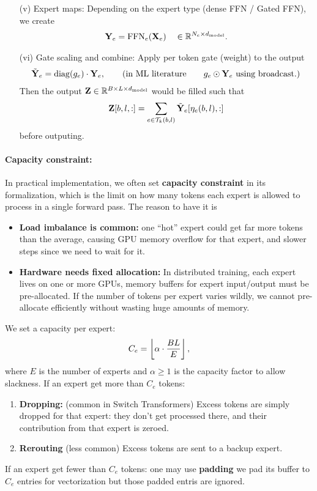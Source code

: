 \documentclass[11pt]{article}  %
\begin{document}
\begin{itemize}
  \item[(v)] Expert maps:
  Depending on the expert type (dense FFN / Gated FFN), we create 
  \begin{align*}
    \mathbf{Y}_e = \text{FFN}_e(\mathbf{X}_e) \quad \in \mathbb{R}^{N_e \times d_{\text{model}}}.
  \end{align*}

  \item[(vi)] Gate scaling and combine:
  Apply per token gate (weight) to the output 
  \begin{align*}
    \tilde{\mathbf{Y}}_e = \operatorname{diag} (g_e) \cdot \mathbf{Y}_e, \qquad (\text{in ML literature} \qquad g_e \odot \mathbf{Y}_e \text{ using broadcast.}) 
  \end{align*}
  Then the output $\mathbf{Z} \in \mathbb{R}^{B \times L \times d_{\text{model}}}$ would be filled such that 
  \begin{align*}
    \mathbf{Z}[b, l, :] = \sum_{e \in \mathcal{T}_k(b, l)} \tilde{\mathbf{Y}}_e[\eta_e(b, l), :]
  \end{align*}
  before outputing.
\end{itemize}

\paragraph{Capacity constraint:} In practical implementation, we often set \textbf{capacity constraint} in its formalization, which is the limit on how many tokens each expert is allowed to process in a single forward pass.
The reason to have it is 
\begin{itemize}
  \item \textbf{Load imbalance is common:} one ``hot'' expert could get far more tokens than the average, causing GPU memory overflow for that expert, and slower steps since we need to wait for it.
  \item \textbf{Hardware needs fixed allocation:} In distributed training, each expert lives on one or more GPUs, memory buffers for expert input/output must be pre-allocated. 
  If the number of tokens per expert varies wildly, we cannot pre-allocate efficiently without wasting huge amounts of memory.
\end{itemize}
We set a capacity per expert:
\begin{align*}
  C_e = \left\lfloor \alpha \cdot \frac{BL}{E} \right\rfloor,
\end{align*}
where $E$ is the number of experts and $\alpha \geq 1$ is the capacity factor to allow slackness. 
If an expert get more than $C_e$ tokens:
\begin{enumerate}
  \item \textbf{Dropping:} (common in Switch Transformers) Excess tokens are simply dropped for that expert: they don't get processed there, and their contribution from that expert is zeroed.
  \item \textbf{Rerouting} (less common) Excess tokens are sent to a backup expert.
\end{enumerate}
If an expert get fewer than $C_e$ tokens: one may use \textbf{padding} we pad its buffer to $C_e$ entries for vectorization but those padded entris are ignored.
\end{document}
